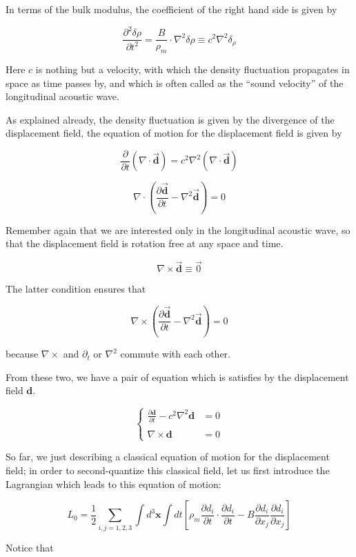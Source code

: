 In terms of the bulk modulus, the coefficient of the right hand side is given by

\[\frac{\partial^2\delta\rho}{\partial t^2} = \frac{B}{\rho_m}\cdot\nabla^2\delta\rho \equiv c^2\nabla^2\delta_\rho \]

Here $c$ is nothing but a velocity, with which the density fluctuation propagates in space as time passes by, and which is often called as the ``sound velocity'' of the longitudinal acoustic wave.

As explained already, the density fluctuation is given by the divergence of the displacement field, the equation of motion for the displacement field is given by

\[\frac{\partial}{\partial t}(\nabla\cdot\vec{\bm{d}}) = c^2\nabla^2(\nabla\cdot\vec{\bm{d}}) \]

\[\nabla\cdot\left(\frac{\partial \vec{\bm{d}}}{\partial t} - \nabla^2\vec{\bm{d}}\right) = 0 \]

Remember again that we are interested only in the longitudinal acoustic wave, so that the displacement field is rotation free at any space and time.

\[\nabla\times\vec{\bm{d}} \equiv\vec{0} \]

The latter condition ensures that

\[\nabla\times\left(\frac{\partial \vec{\bm{d}}}{\partial t} - \nabla^2\vec{\bm{d}}\right) = 0\]

because $\nabla\times$ and $\partial_t$ or $\nabla^2$ commute with each other.

From these two, we have a pair of equation which is satisfies by the displacement field $\bm{d}$.

\[\begin{cases}
\frac{\partial\bm{d}}{\partial t} - c^2\nabla^2\bm{d} &= 0\\
\ &\ \\
\nabla\times\bm{d} &= 0
\end{cases}\]

So far, we just describing a classical equation of motion for the displacement field; in order to second-quantize this classical field, let us first introduce the Lagrangian which leads to this equation of motion:

\[L_0 = \frac{1}{2}\sum_{i,j=1,2,3}\int d^3\bm{x}\int dt\left[\rho_m\frac{\partial d_i}{\partial t}\cdot\frac{\partial d_i}{\partial t} - B\frac{\partial d_i}{\partial x_j}\frac{\partial d_i}{\partial x_j}\right]\]

Notice that

